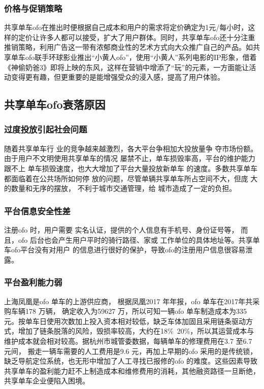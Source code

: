 \documentclass[a4paper,oneside,12pt]{article}
\begin{document}
\subsubsection{价格与促销策略}

共享单车ofo在推出时便根据自己成本和用户的需求将定价确定为1元/每小时，这样的定价让许多人都可以接受，扩大了用户群体。同时，共享单车ofo还十分注重推销策略，利用广告这一带有浓郁商业性的艺术方式向大众推广自己的产品。如共享单车ofo联手环球影业推出“小黄人ofo”，使用“小黄人”系列电影的IP形象，借着《神偷奶爸3》即将上映的东风，这样在营销中增添了“玩”的元素，一方面能让活动变得更有趣，但更重要的是能增强受众的浸入感，提高了用户体验。


\subsection{共享单车ofo衰落原因}

\subsubsection{过度投放引起社会问题}
随着共享单车行
业的竞争越来越激烈，各大平台争相加大投放量争
夺市场份额。由于用户不文明使用共享单车的情况
屡禁不止，单车损毁率高，平台的维护能力跟不上
单车损毁速度，也大大增加了平台大量投放新单车
的速度。多数共享单车都面临着在公共场所如何停
放的问题，尽管单辆共享单车所占空间不大，但庞
大的数量和无序的摆放， 不利于城市交通管理，给
城市造成了一定的负担。

\subsubsection{平台信息安全性差}
注册ofo 时，用户需要
实名认证，提供的个人信息有手机号、身份证号等，
而且，ofo 后台也会产生用户平时的骑行路径、家或
工作单位的具体地址等。共享单车ofo平台没有对用户
的信息进行很好的保护，导致ofo的注册用户信息很容易泄露。


\subsubsection{平台盈利能力弱}

上海凤凰是ofo 单车的上游供应商， 根据凤凰2017 年年报，ofo 单车在2017年共采购车辆178 万辆， 确定收入为59627 万，所以可知一辆ofo 单车制造成本为335 元。按单车日使用次数加上投入资本相对较低，缺乏车体加固且采用链条驱动方式，增加了链条脱落的风险，毁损率较高，大约在18\%~20\%，所以其运营成本与维护成本就会相对较高。据杭州市城管委数据，每辆单车的修理费用在3.7 至6.7 元间， 搬走一辆车需要的人工费用是9.6 元，再加上早期的ofo 采用的是传统锁，缺乏导航定位系统，也无形中增加了人工寻找已报修的ofo 的难度。这些因素导致共享单车的盈利能力赶不上制造成本和维修费用的消耗，其他融资路径一旦断绝，共享单车企业便陷入困境。
\end{document}
